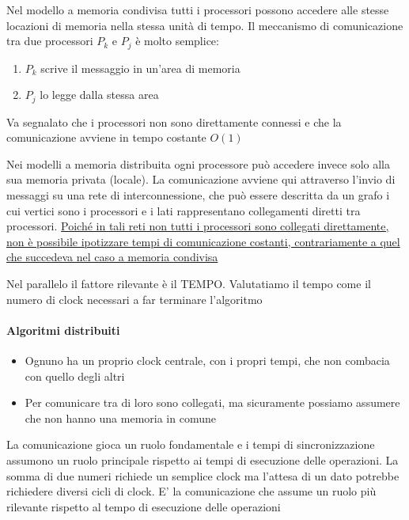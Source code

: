Nel modello a memoria condivisa tutti i processori possono accedere alle stesse locazioni di memoria nella stessa unità di tempo. Il meccanismo di comunicazione tra due processori $P_k$ e $P_j$ è molto semplice:
\begin{enumerate}
    \item $P_k$ scrive il messaggio in un’area di memoria
    \item $P_j$ lo legge dalla stessa area
\end{enumerate}
Va segnalato che i processori non sono direttamente connessi e che la comunicazione avviene in tempo costante $O(1)$

Nei modelli a memoria distribuita ogni processore può accedere invece solo alla sua memoria privata (locale). La comunicazione avviene qui attraverso l’invio di messaggi su una rete di interconnessione, che può essere descritta da un grafo i cui vertici sono i processori e i lati rappresentano collegamenti diretti tra processori. \uline{Poiché in tali reti non tutti i processori sono collegati direttamente, non è possibile ipotizzare tempi di comunicazione costanti, contrariamente a quel che succedeva nel caso a memoria condivisa}

Nel parallelo il fattore rilevante è il TEMPO. Valutatiamo il tempo come il numero di clock necessari a far terminare l'algoritmo

\paragraph{Algoritmi distribuiti}
\begin{itemize}
    \item Ognuno ha un proprio clock centrale, con i propri tempi, che non combacia con quello degli altri
    \item Per comunicare tra di loro sono collegati, ma sicuramente possiamo assumere che non hanno una memoria in comune
\end{itemize}

\begin{osservazione}
La comunicazione gioca un ruolo fondamentale e i tempi di sincronizzazione assumono un ruolo principale rispetto ai tempi di esecuzione delle operazioni. La somma di due numeri richiede un semplice clock ma l'attesa di un dato potrebbe richiedere diversi cicli di clock. E' la comunicazione che assume un ruolo più rilevante rispetto al tempo di esecuzione delle operazioni
\end{osservazione}

